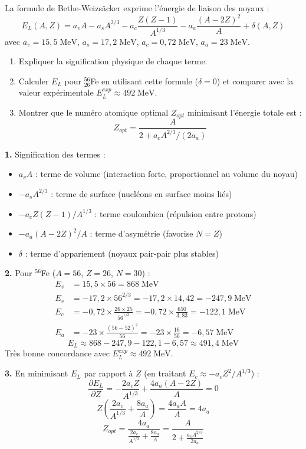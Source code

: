 \documentclass[12pt,a4paper]{article}
\begin{document}
\begin{boiteexercice}
La formule de Bethe-Weizsäcker exprime l'énergie de liaison des noyaux :
\[
E_L(A,Z) = a_v A - a_s A^{2/3} - a_c \frac{Z(Z-1)}{A^{1/3}} - a_a\frac{(A-2Z)^2}{A} + \delta(A,Z)
\]
avec $a_v = 15{,}5\;\text{MeV}$, $a_s = 17{,}2\;\text{MeV}$, $a_c = 0{,}72\;\text{MeV}$, $a_a = 23\;\text{MeV}$.
\begin{enumerate}
  \item Expliquer la signification physique de chaque terme.
  \item Calculer $E_L$ pour ${}^{56}_{26}$Fe en utilisant cette formule ($\delta=0$) et comparer avec la valeur expérimentale $E_L^{exp} \approx 492\;\text{MeV}$.
  \item Montrer que le numéro atomique optimal $Z_{opt}$ minimisant l'énergie totale est :
  \[
  Z_{opt} = \frac{A}{2 + a_c A^{2/3}/(2a_a)}
  \]
\end{enumerate}
\end{boiteexercice}

\begin{boitecorrige}
\textbf{1.} Signification des termes :
\begin{itemize}[nosep]
  \item $a_v A$ : terme de volume (interaction forte, proportionnel au volume du noyau)
  \item $-a_s A^{2/3}$ : terme de surface (nucléons en surface moins liés)
  \item $-a_c Z(Z-1)/A^{1/3}$ : terme coulombien (répulsion entre protons)
  \item $-a_a(A-2Z)^2/A$ : terme d'asymétrie (favorise $N=Z$)
  \item $\delta$ : terme d'appariement (noyaux pair-pair plus stables)
\end{itemize}

\textbf{2.} Pour ${}^{56}$Fe ($A=56$, $Z=26$, $N=30$) :
\begin{align*}
E_v &= 15{,}5 \times 56 = 868\;\text{MeV} \\
E_s &= -17{,}2 \times 56^{2/3} = -17{,}2 \times 14{,}42 = -247{,}9\;\text{MeV} \\
E_c &= -0{,}72 \times \frac{26\times25}{56^{1/3}} = -0{,}72\times\frac{650}{3{,}83} = -122{,}1\;\text{MeV} \\
E_a &= -23 \times \frac{(56-52)^2}{56} = -23\times\frac{16}{56} = -6{,}57\;\text{MeV}
\end{align*}
\[
E_L \approx 868 - 247{,}9 - 122{,}1 - 6{,}57 \approx 491{,}4\;\text{MeV}
\]
Très bonne concordance avec $E_L^{exp} \approx 492\;\text{MeV}$.

\textbf{3.} En minimisant $E_L$ par rapport à $Z$ (en traitant $E_c \approx -a_c Z^2/A^{1/3}$) :
\[
\frac{\partial E_L}{\partial Z} = -\frac{2a_c Z}{A^{1/3}} + \frac{4a_a(A-2Z)}{A} = 0
\]
\[
Z\left(\frac{2a_c}{A^{1/3}} + \frac{8a_a}{A}\right) = \frac{4a_a A}{A} = 4a_a
\]
\[
Z_{opt} = \frac{4a_a}{\frac{2a_c}{A^{1/3}} + \frac{8a_a}{A}} = \frac{A}{2 + \frac{a_c A^{2/3}}{2a_a}}
\]
\end{boitecorrige}
\end{document}
